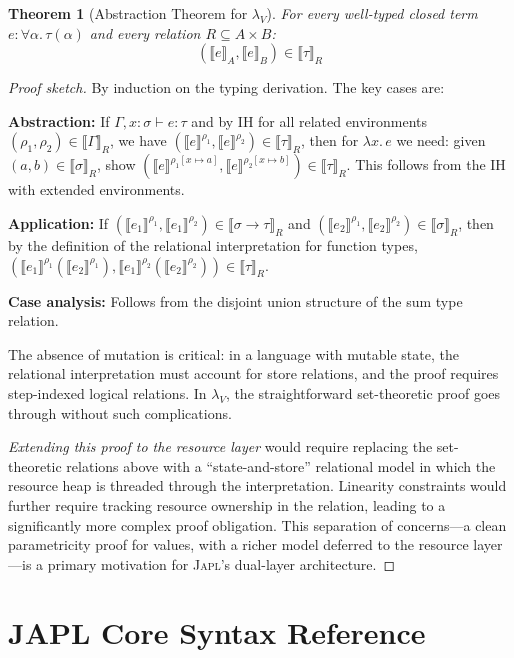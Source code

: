 \documentclass[11pt]{article}
\newtheorem{theorem}{Theorem}[section]
\theoremstyle{definition}
\theoremstyle{remark}
\newcommand{\sem}[1]{\llbracket #1 \rrbracket}
\newcommand{\japl}{\textsc{Japl}}
\begin{document}
\begin{theorem}[Abstraction Theorem for $\lambda_V$]
For every well-typed closed term $e : \forall \alpha.\, \tau(\alpha)$
and every relation $R \subseteq A \times B$:
\[
  (\sem{e}_A, \sem{e}_B) \in \sem{\tau}_R
\]
\end{theorem}

\begin{proof}[Proof sketch]
By induction on the typing derivation.  The key cases are:

\textbf{Abstraction:} If $\Gamma, x:\sigma \vdash e : \tau$ and
by IH for all related environments $(\rho_1, \rho_2) \in
\sem{\Gamma}_R$, we have $(\sem{e}^{\rho_1}, \sem{e}^{\rho_2}) \in
\sem{\tau}_R$, then for $\lambda x.\, e$ we need: given
$(a, b) \in \sem{\sigma}_R$, show
$(\sem{e}^{\rho_1[x \mapsto a]}, \sem{e}^{\rho_2[x \mapsto b]}) \in
\sem{\tau}_R$.  This follows from the IH with extended environments.

\textbf{Application:} If $(\sem{e_1}^{\rho_1}, \sem{e_1}^{\rho_2})
\in \sem{\sigma \to \tau}_R$ and $(\sem{e_2}^{\rho_1},
\sem{e_2}^{\rho_2}) \in \sem{\sigma}_R$, then by the definition of
the relational interpretation for function types,
$(\sem{e_1}^{\rho_1}(\sem{e_2}^{\rho_1}),
\sem{e_1}^{\rho_2}(\sem{e_2}^{\rho_2})) \in \sem{\tau}_R$.

\textbf{Case analysis:} Follows from the disjoint union structure of
the sum type relation.

The absence of mutation is critical: in a language with mutable state,
the relational interpretation must account for store relations, and
the proof requires step-indexed logical relations.  In $\lambda_V$,
the straightforward set-theoretic proof goes through without such
complications.

\emph{Extending this proof to the resource layer} would require
replacing the set-theoretic relations above with a ``state-and-store''
relational model in which the resource heap is threaded through the
interpretation.  Linearity constraints would further require tracking
resource ownership in the relation, leading to a significantly more
complex proof obligation.  This separation of concerns---a clean
parametricity proof for values, with a richer model deferred to the
resource layer---is a primary motivation for \japl{}'s dual-layer
architecture.
\end{proof}

\section{JAPL Core Syntax Reference}
\label{app:syntax}
\end{document}
